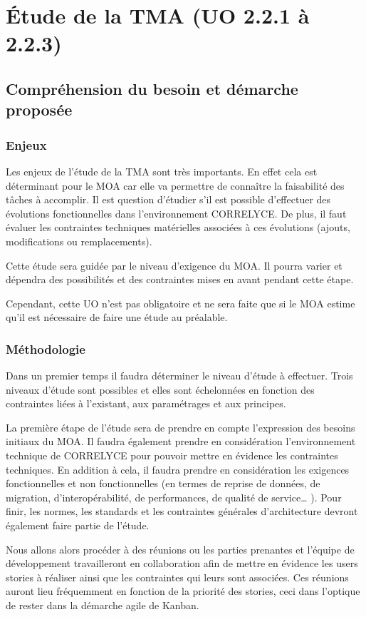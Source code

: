 \section{Étude de la TMA (UO 2.2.1 à 2.2.3)}
	\subsection{Compréhension du besoin et démarche proposée}
	\subsubsection{Enjeux}
	Les enjeux de l’étude de la TMA sont très importants. En effet cela est déterminant pour le MOA car elle va permettre de connaître la faisabilité des tâches à accomplir. Il est question d’étudier s’il est possible d’effectuer des évolutions fonctionnelles dans l’environnement CORRELYCE. De plus, il faut évaluer les contraintes techniques matérielles associées à ces évolutions (ajouts, modifications ou remplacements).
	
	Cette étude sera guidée par le niveau d’exigence du MOA. Il pourra varier et dépendra des possibilités et des contraintes mises en avant pendant cette étape.
	
	Cependant, cette UO n’est pas obligatoire et ne sera faite que si le MOA estime qu’il est nécessaire de faire une étude au préalable.
	
	\subsubsection{Méthodologie}
	Dans un premier temps il faudra déterminer le niveau d’étude à effectuer. Trois niveaux d’étude sont possibles et elles sont échelonnées en fonction des contraintes liées à l’existant, aux paramétrages et aux principes.
	
	La première étape de l’étude sera de prendre en compte l’expression des besoins initiaux du MOA. Il faudra également prendre en considération l’environnement technique de CORRELYCE pour pouvoir mettre en évidence les contraintes techniques. En addition à cela, il faudra prendre en considération les exigences fonctionnelles et non fonctionnelles (en termes de reprise de données, de migration, d'interopérabilité, de performances, de qualité de service… ). Pour finir, les normes, les standards et les contraintes générales d’architecture devront également faire partie de l’étude.
	
	Nous allons alors procéder à des réunions ou les parties prenantes et l’équipe de développement travailleront en collaboration afin de mettre en évidence les users stories à réaliser ainsi que les contraintes qui leurs sont associées. Ces réunions auront lieu fréquemment en fonction de la priorité des stories, ceci dans l’optique de rester dans la démarche agile de Kanban.
	
